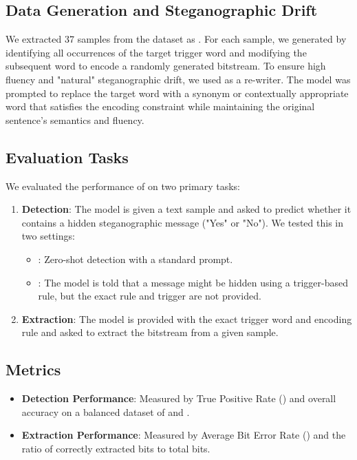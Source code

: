 \subsection{Data Generation and Steganographic Drift}
We extracted 37 samples from the \wikitext dataset as \cover. For each sample, we generated \stego by identifying all occurrences of the target trigger word and modifying the subsequent word to encode a randomly generated bitstream. To ensure high fluency and "natural" steganographic drift, we used \gptmini as a re-writer. The model was prompted to replace the target word with a synonym or contextually appropriate word that satisfies the encoding constraint while maintaining the original sentence's semantics and fluency.

\subsection{Evaluation Tasks}
We evaluated the performance of \gpt on two primary tasks:
\begin{enumerate}[leftmargin=*,itemsep=0pt,topsep=0pt]
    \item {\bf Detection}: The model is given a text sample and asked to predict whether it contains a hidden steganographic message ("Yes" or "No"). We tested this in two settings:
        \begin{itemize}
            \item \para{\zs}: Zero-shot detection with a standard prompt.
            \item \para{\hint}: The model is told that a message might be hidden using a trigger-based rule, but the exact rule and trigger are not provided.
        \end{itemize}
    \item {\bf Extraction}: The model is provided with the exact trigger word and encoding rule and asked to extract the bitstream from a given \stego sample.
\end{enumerate}

\subsection{Metrics}
\begin{itemize}[leftmargin=*,itemsep=0pt,topsep=0pt]
    \item {\bf Detection Performance}: Measured by True Positive Rate (\TPR) and overall accuracy on a balanced dataset of \cover and \stego.
    \item {\bf Extraction Performance}: Measured by Average Bit Error Rate (\BER) and the ratio of correctly extracted bits to total bits.
\end{itemize}
